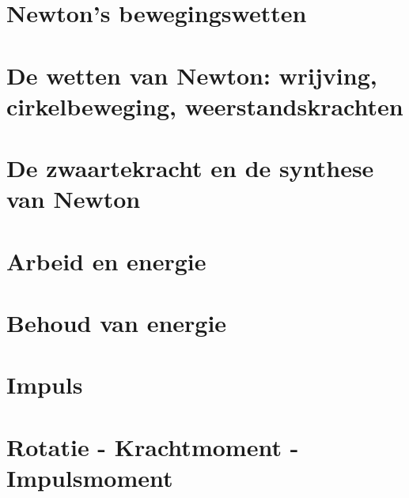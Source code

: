 \section{Newton's bewegingswetten}

\vspace{0.5cm}



\newpage

\section{De wetten van Newton: wrijving, cirkelbeweging, weerstandskrachten}

\vspace{0.5cm}



\newpage

\section{De zwaartekracht en de synthese van Newton}

\vspace{0.5cm}



\newpage

\section{Arbeid en energie}

\vspace{0.5cm}



\newpage

\section{Behoud van energie}

\vspace{0.5cm}



\newpage

\section{Impuls}

\vspace{0.5cm}



\newpage

\section{Rotatie - Krachtmoment - Impulsmoment}

\vspace{0.5cm}

